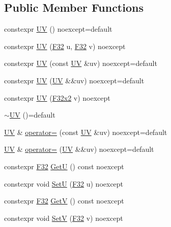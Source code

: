 \subsection*{Public Member Functions}
\begin{DoxyCompactItemize}
\item 
constexpr \mbox{\hyperlink{structmage_1_1_u_v_adc1ec1943378b391e1eeba840070b62c}{UV}} () noexcept=default
\item 
constexpr \mbox{\hyperlink{structmage_1_1_u_v_a383d9dff35f65343ea90284a07581b1f}{UV}} (\mbox{\hyperlink{namespacemage_aa97e833b45f06d60a0a9c4fc22ae02c0}{F32}} u, \mbox{\hyperlink{namespacemage_aa97e833b45f06d60a0a9c4fc22ae02c0}{F32}} v) noexcept
\item 
constexpr \mbox{\hyperlink{structmage_1_1_u_v_a2756ef5aa4b99bd8d8bce4b43c205e30}{UV}} (const \mbox{\hyperlink{structmage_1_1_u_v}{UV}} \&uv) noexcept=default
\item 
constexpr \mbox{\hyperlink{structmage_1_1_u_v_aea441530786bac9c6eb02bff653834bd}{UV}} (\mbox{\hyperlink{structmage_1_1_u_v}{UV}} \&\&uv) noexcept=default
\item 
constexpr \mbox{\hyperlink{structmage_1_1_u_v_ab5b287a94fef45b70f7c6d50ede33bff}{UV}} (\mbox{\hyperlink{namespacemage_a9dc0d34d6ecc87e4cfa4a826102117bc}{F32x2}} v) noexcept
\item 
\mbox{\hyperlink{structmage_1_1_u_v_a9389be8cc9bb64861b69f79b44b6dd1b}{$\sim$\+UV}} ()=default
\item 
\mbox{\hyperlink{structmage_1_1_u_v}{UV}} \& \mbox{\hyperlink{structmage_1_1_u_v_a90eed8d6fd280be4fb82c3ae389b50d1}{operator=}} (const \mbox{\hyperlink{structmage_1_1_u_v}{UV}} \&uv) noexcept=default
\item 
\mbox{\hyperlink{structmage_1_1_u_v}{UV}} \& \mbox{\hyperlink{structmage_1_1_u_v_ade2a86b1358b667df2bf20297bfae537}{operator=}} (\mbox{\hyperlink{structmage_1_1_u_v}{UV}} \&\&uv) noexcept=default
\item 
constexpr \mbox{\hyperlink{namespacemage_aa97e833b45f06d60a0a9c4fc22ae02c0}{F32}} \mbox{\hyperlink{structmage_1_1_u_v_a8587903b07cab58428d01ed9ded97dd4}{GetU}} () const noexcept
\item 
constexpr void \mbox{\hyperlink{structmage_1_1_u_v_a0c7826aed81123c47129d552c696ab18}{SetU}} (\mbox{\hyperlink{namespacemage_aa97e833b45f06d60a0a9c4fc22ae02c0}{F32}} u) noexcept
\item 
constexpr \mbox{\hyperlink{namespacemage_aa97e833b45f06d60a0a9c4fc22ae02c0}{F32}} \mbox{\hyperlink{structmage_1_1_u_v_a95b38718cb3eeaacebdfa306b4921d90}{GetV}} () const noexcept
\item 
constexpr void \mbox{\hyperlink{structmage_1_1_u_v_aa76b301726c43197f6de07ff6fec71b2}{SetV}} (\mbox{\hyperlink{namespacemage_aa97e833b45f06d60a0a9c4fc22ae02c0}{F32}} v) noexcept
\end{DoxyCompactItemize}
